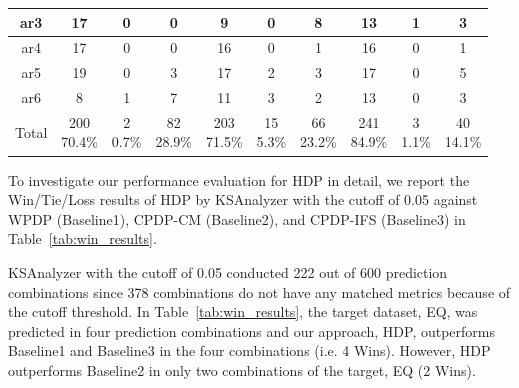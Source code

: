 \begin{table}[!t]
\begin{tabular}{|@{}c@{}||@{}c@{}|@{}c@{}|@{}c@{}||@{}c@{}|@{}c@{}|@{}c@{}||@{}c@{}|@{}c@{}|@{}c@{}|}
ar3	&17	&0 	&0	&9	&0 	&8	&13	&1 	&3\\ \hline
ar4	&17	&0 	&0	&16	&0 	&1	&16	&0 	&1\\ \hline
ar5	&19	&0 	&3	&17	&2 	&3	&17	&0 	&5\\ \hline
ar6	&8	&1 	&7	&11	&3 	&2	&13	&0 	&3\\ \hline
Total	&\specialcell{{200}\\{70.4\%}}	&\specialcell{{2}\\{0.7\%}}	&\specialcell{{82}\\{28.9\%}}	&\specialcell{{203}\\{71.5\%}}	&\specialcell{{15}\\{5.3\%}}	&\specialcell{{66}\\{23.2\%}}	&\specialcell{{241}\\{84.9\%}}	&\specialcell{{3}\\{1.1\%}}	&\specialcell{{40}\\{14.1\%}}\\ \hline

\end{tabular}
\end{table}


To investigate our performance evaluation for HDP in detail, we report
the Win/Tie/Loss results of HDP by KSAnalyzer with the cutoff of 0.05 against
WPDP (Baseline1), CPDP-CM (Baseline2), and CPDP-IFS
(Baseline3) in Table~\ref{tab:win_results}.


KSAnalyzer with the cutoff of 0.05 conducted 222 out of 600 prediction
combinations since 378 combinations do not have any matched
metrics because of the cutoff threshold. In
Table~\ref{tab:win_results}, the target dataset, EQ, was predicted in four
prediction combinations and our approach, HDP, outperforms Baseline1 and
Baseline3 in the four combinations (i.e. 4 Wins). However, HDP outperforms
Baseline2 in only two combinations of the target, EQ (2 Wins). 


